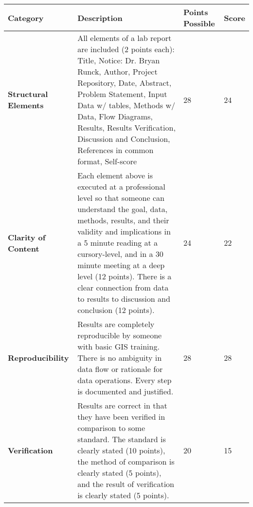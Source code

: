 \documentclass[article,12pt]{article}
\numberwithin{equation}{section}
\begin{document}
\begin{tabular}{|p{.2\linewidth}|p{.2\linewidth}|p{.2\linewidth}|p{.1\linewidth}|}
	\hline
	\textbf{Category}            & \textbf{Description}                                                                                                                                                                                                                                                                                                                                              & \textbf{Points Possible} & \textbf{Score} \\ \hline
\vspace{.2in}\textbf{Structural Elements} & {\tiny All elements of a lab report are included (2 points each): Title, Notice: Dr. Bryan Runck, Author, Project Repository, Date, Abstract, Problem Statement, Input Data w/ tables, Methods w/ Data, Flow Diagrams, Results, Results Verification, Discussion and Conclusion, References in common format, Self-score}                                        & \vspace{.2in}28              &   \vspace{.2in}24    \\ \hline
	\vspace{.2in}\textbf{Clarity of Content}  & {\tiny Each element above is executed at a professional level so that someone can understand the goal, data, methods, results, and their validity and implications in a 5 minute reading at a cursory-level, and in a 30 minute meeting at a deep level (12 points). There is a clear connection from data to results to discussion and conclusion (12 points).} & \vspace{.2in}24              &  \vspace{.2in}22     \\ \hline
	\vspace{.2in}\textbf{Reproducibility}     & {\tiny Results are completely reproducible by someone with basic GIS training. There is no ambiguity in data flow or rationale for data operations. Every step is documented and justified.}                                                                                                                                                                     & \vspace{.2in}28              &     \vspace{.2in}28  \\ \hline
	\vspace{.2in}\textbf{Verification}        & {\tiny Results are correct in that they have been verified in comparison to some standard. The standard is clearly stated (10 points), the method of comparison is clearly stated (5 points), and the result of verification is clearly stated (5 points).}                                                                                                      & \vspace{.2in}20              &   \vspace{.2in}15   \\ \hline

\end{tabular}
\end{document}
